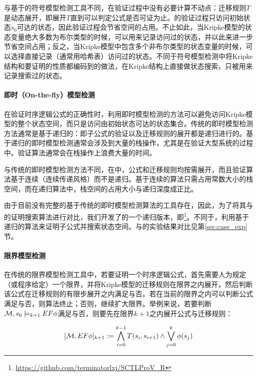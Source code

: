 与基于\BDD{}的符号模型检测工具不同，\sctlprov{}在验证过程中没有必要计算不动点：迁移规则$T$是动态展开，即展开$T$直到可以判定公式是否可证为止。\sctlprov{}的验证过程只访问初始状态$s_0$可达的状态，因此验证过程会节省空间的占用。不止如此，当Kripke模型的状态变量绝大多数为布尔类型的时候，\sctlprov{}可以用\BDD{}来记录访问过的状态，并以此来进一步节省空间占用；反之，当Kripke模型中包含多个非布尔类型的状态变量的时候，\sctlprov{}可以选择直接记录（通常用哈希表）访问过的状态。不同于符号模型检测中将Kripke结构和要证明的性质都编码到\BDD{}的做法，\sctlprov{}在Kripke结构上直接做状态搜索，\BDD{}只被用来记录搜索过的状态。

\paragraph{即时（On-the-fly）模型检测}
在验证时序逻辑公式的正确性时，利用即时模型检测的方法可以避免访问Kripke模型的整个状态空间，而只是访问由初始状态可达的状态集合。传统的\CTL{}即时模型检测方法\cite{VergauwenL93,BCG95}通常是基于递归的：即子公式的验证以及迁移规则的展开都是递归进行的。基于递归的\CTL{}即时模型检测通常会涉及到大量的栈操作，尤其是在验证大型系统的过程中。验证算法通常会在栈操作上浪费大量的时间。

与传统的\CTL{}即时模型检测方法不同，在\sctlprov{}中，公式和迁移规则均按需展开，而且验证算法基于连续（连续传递风格）而不是递归。基于连续的算法只需占用常数大小的栈空间\cite{Reynolds93,Appel06,Sestoft12}，而在递归算法中，栈空间的占用大小与递归深度成正比。

由于目前没有完整的基于传统的即时模型检测算法的工具存在，因此，为了将其与\sctlprov{}的证明搜索算法进行对比，我们开发了\sctlprov{}的一个递归版本，即\sctlprovr{}\footnote{\url{https://github.com/terminatorlxj/SCTLProV_R}}。不同于\sctlprov{}，\sctlprovr{}利用基于递归的算法来证明子公式并搜索状态空间。\sctlprov{}与\sctlprovr{}的实验结果对比见第\ref{sec:case_exp}节。

\paragraph{限界模型检测}
在传统的限界模型检测工具中，若要证明一个时序逻辑公式，首先需要人为规定（或程序给定）一个限界，并将Kripke模型的迁移规则在限界之内展开，然后判断该公式在迁移规则的有限步展开之内满足与否。若在当前的限界之内可以判断公式满足与否，则算法终止；否则，继续扩大限界。举例来说，若要判断${\cal M}, s_0 \models_{k+1} EF\phi$满足与否，则要先在限界$k+1$之内展开公式与迁移规则\cite{BCCZ99}：

\begin{small}
	$$ [{\cal M},EF\phi]_{k+1} := \bigwedge^{k-1}_{i=0}T(s_i,s_{i+1}) \wedge \bigvee_{j=0}^k\phi(s_j)$$
\end{small}

